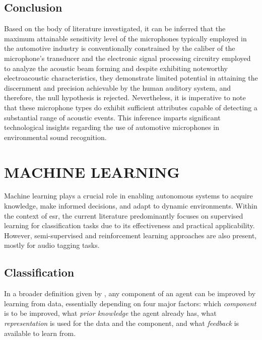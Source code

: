 \subsection{Conclusion}
\label{subsec:microphones_conclusion}

Based on the body of literature investigated, it can be inferred that the maximum attainable sensitivity level of the microphones typically employed in the automotive industry is conventionally constrained by the caliber of the microphone's transducer and the electronic signal processing circuitry employed to analyze the acoustic beam forming and despite exhibiting noteworthy electroacoustic characteristics, they demonstrate limited potential in attaining the discernment and precision achievable by the human auditory system, and therefore, the null hypothesis is rejected. Nevertheless, it is imperative to note that these microphone types do exhibit sufficient attributes capable of detecting a substantial range of acoustic events. This inference imparts significant technological insights regarding the use of automotive microphones in environmental sound recognition.


\section{MACHINE LEARNING}
\label{sec:frmwk_machine_learning}

Machine learning plays a crucial role in enabling autonomous systems to acquire knowledge, make informed decisions, and adapt to dynamic environments. Within the context of \gls{esr}, the current literature predominantly focuses on supervised learning for classification tasks due to its effectiveness and practical applicability. However, semi-supervised and reinforcement learning approaches are also present, mostly for audio tagging tasks. 


\subsection{Classification}
\label{subsec:machine_learning_classification}

In a broader definition given by \textcite{Russel2010}, any component of an agent can be improved by learning from data, essentially depending on four major factors: which \textit{component} is to be improved, what \textit{prior knowledge} the agent already has, what \textit{representation} is used for the data and the component, and what \textit{feedback} is available to learn from.

